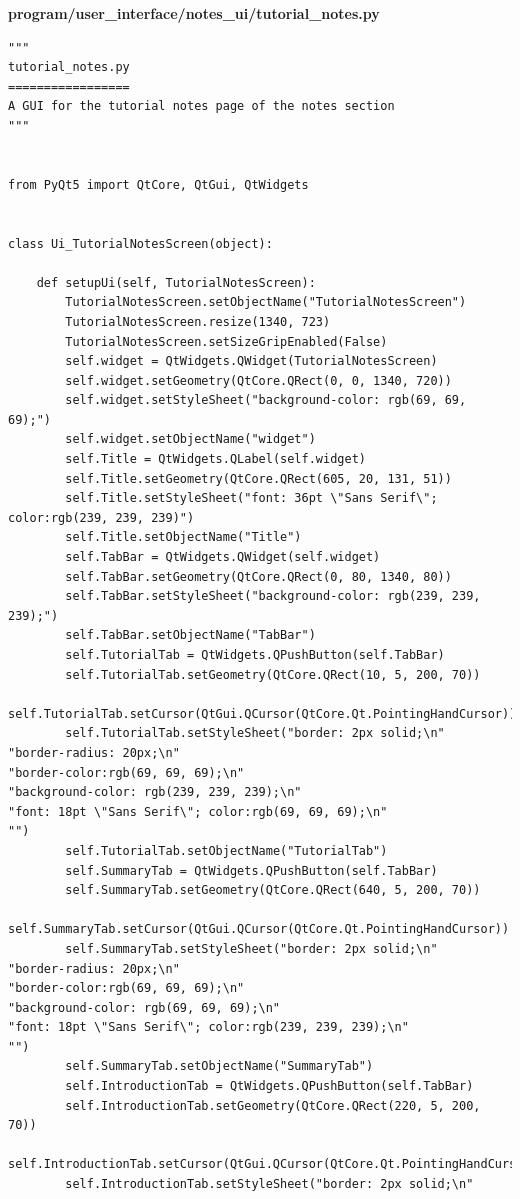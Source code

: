 \documentclass{article}
\begin{document}
\textbf{program/user\_interface/notes\_ui/tutorial\_notes.py}
\begin{lstlisting}
"""
tutorial_notes.py
=================
A GUI for the tutorial notes page of the notes section
"""


from PyQt5 import QtCore, QtGui, QtWidgets


class Ui_TutorialNotesScreen(object):

    def setupUi(self, TutorialNotesScreen):
        TutorialNotesScreen.setObjectName("TutorialNotesScreen")
        TutorialNotesScreen.resize(1340, 723)
        TutorialNotesScreen.setSizeGripEnabled(False)
        self.widget = QtWidgets.QWidget(TutorialNotesScreen)
        self.widget.setGeometry(QtCore.QRect(0, 0, 1340, 720))
        self.widget.setStyleSheet("background-color: rgb(69, 69, 69);")
        self.widget.setObjectName("widget")
        self.Title = QtWidgets.QLabel(self.widget)
        self.Title.setGeometry(QtCore.QRect(605, 20, 131, 51))
        self.Title.setStyleSheet("font: 36pt \"Sans Serif\"; color:rgb(239, 239, 239)")
        self.Title.setObjectName("Title")
        self.TabBar = QtWidgets.QWidget(self.widget)
        self.TabBar.setGeometry(QtCore.QRect(0, 80, 1340, 80))
        self.TabBar.setStyleSheet("background-color: rgb(239, 239, 239);")
        self.TabBar.setObjectName("TabBar")
        self.TutorialTab = QtWidgets.QPushButton(self.TabBar)
        self.TutorialTab.setGeometry(QtCore.QRect(10, 5, 200, 70))
        self.TutorialTab.setCursor(QtGui.QCursor(QtCore.Qt.PointingHandCursor))
        self.TutorialTab.setStyleSheet("border: 2px solid;\n"
"border-radius: 20px;\n"
"border-color:rgb(69, 69, 69);\n"
"background-color: rgb(239, 239, 239);\n"
"font: 18pt \"Sans Serif\"; color:rgb(69, 69, 69);\n"
"")
        self.TutorialTab.setObjectName("TutorialTab")
        self.SummaryTab = QtWidgets.QPushButton(self.TabBar)
        self.SummaryTab.setGeometry(QtCore.QRect(640, 5, 200, 70))
        self.SummaryTab.setCursor(QtGui.QCursor(QtCore.Qt.PointingHandCursor))
        self.SummaryTab.setStyleSheet("border: 2px solid;\n"
"border-radius: 20px;\n"
"border-color:rgb(69, 69, 69);\n"
"background-color: rgb(69, 69, 69);\n"
"font: 18pt \"Sans Serif\"; color:rgb(239, 239, 239);\n"
"")
        self.SummaryTab.setObjectName("SummaryTab")
        self.IntroductionTab = QtWidgets.QPushButton(self.TabBar)
        self.IntroductionTab.setGeometry(QtCore.QRect(220, 5, 200, 70))
        self.IntroductionTab.setCursor(QtGui.QCursor(QtCore.Qt.PointingHandCursor))
        self.IntroductionTab.setStyleSheet("border: 2px solid;\n"

\end{lstlisting}
\end{document}
